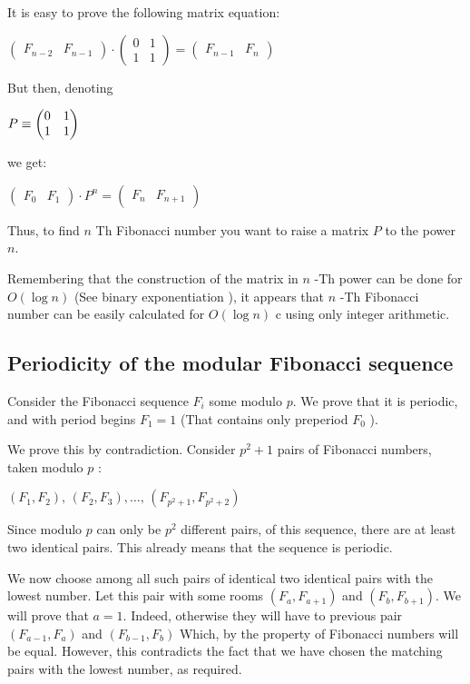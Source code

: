 It is easy to prove the following matrix equation:

$\begin{pmatrix}F_{n-2} & F_{n-1}\end{pmatrix}\cdot\begin{pmatrix}0 & 1\\
1 & 1
\end{pmatrix}=\begin{pmatrix}F_{n-1} & F_{n}\end{pmatrix}$

But then, denoting

$P \equiv \begin{pmatrix} 0 & 1 \cr 1 & 1 \cr \end{pmatrix}$

we get:

$\begin{pmatrix}F_{0} & F_{1}\end{pmatrix}\cdot P^{n}=\begin{pmatrix}F_{n} & F_{n+1}\end{pmatrix}$

Thus, to find $n$ Th Fibonacci number you want to raise a matrix $P$ to the power $n$.

Remembering that the construction of the matrix in $n$ -Th power can be done for $O (\log n)$ (See binary exponentiation ), it appears that $n$ -Th Fibonacci number can be easily calculated for $O (\log n)$ c using only integer arithmetic.

\subsection{ Periodicity of the modular Fibonacci sequence }

Consider the Fibonacci sequence $F_i$ some modulo $p$. We prove that it is periodic, and with period begins $F_1 = 1$ (That contains only preperiod $F_0$ ).

We prove this by contradiction. Consider $p ^ 2 +1$ pairs of Fibonacci numbers, taken modulo $p$ :

$(F_{1},F_{2}),\,(F_{2},F_{3}),\ldots,\,(F_{p^{2}+1},F_{p^{2}+2})$

Since modulo $p$ can only be $p ^ 2$ different pairs, of this sequence, there are at least two identical pairs. This already means that the sequence is periodic.

We now choose among all such pairs of identical two identical pairs with the lowest number. Let this pair with some rooms $(F_a, F_ {a +1})$ and $(F_b, F_ {b +1})$. We will prove that $a = 1$. Indeed, otherwise they will have to previous pair $(F_ {a-1}, F_a)$ and $(F_ {b-1}, F_b)$ Which, by the property of Fibonacci numbers will be equal. However, this contradicts the fact that we have chosen the matching pairs with the lowest number, as required.

